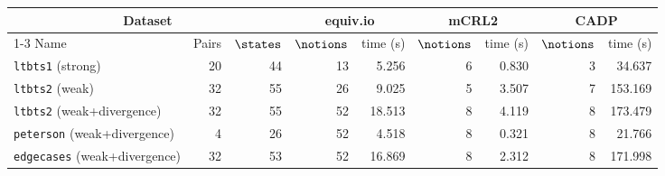 \begin{longtable}{lrr rr rr rr}
\hline
\multicolumn{3}{c}{Dataset} & \multicolumn{2}{c}{equiv.io} & \multicolumn{2}{c}{mCRL2} & \multicolumn{2}{c}{CADP} \\
\cline{1-3}\cline{4-5}\cline{6-7}\cline{8-9}
Name & Pairs & $\states$ & $\notions$ & time (s) & $\notions$ & time (s) & $\notions$ & time (s) \\
\hline
\endhead
\texttt{ltbts1} (strong) & 20 & 44 & 13 & 5.256 & 6 & 0.830 & 3 & 34.637 \\
\texttt{ltbts2} (weak) & 32 & 55 & 26 & 9.025 & 5 & 3.507 & 7 & 153.169 \\
\texttt{ltbts2} (weak+divergence) & 32 & 55 & 52 & 18.513 & 8 & 4.119 & 8 & 173.479 \\
\texttt{peterson} (weak+divergence) & 4 & 26 & 52 & 4.518 & 8 & 0.321 & 8 & 21.766 \\
\texttt{edgecases} (weak+divergence) & 32 & 53 & 52 & 16.869 & 8 & 2.312 & 8 & 171.998 \\
\hline
\end{longtable}

